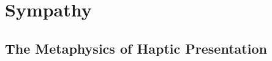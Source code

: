 \chapter{Sympathy} %
\label{cha:sympathy}


\section{The Metaphysics of Haptic Presentation} %
\label{sec:the_metaphysics_of_haptic_presentation}

